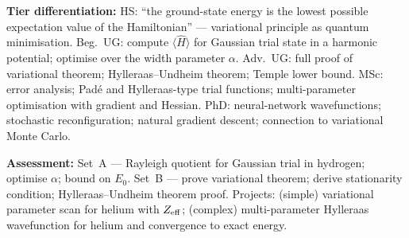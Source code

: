 \documentclass[11pt,a4paper]{article}
\begin{document}
\begin{tcolorbox}[modulebox, title={Module~II.1 / L01: The Variational Principle}]
\medskip\textbf{Tier differentiation:}
HS: ``the ground-state energy is the lowest possible expectation value of the Hamiltonian'' ---
variational principle as quantum minimisation.
Beg.\ UG: compute $\langle\hat{H}\rangle$ for Gaussian trial state in a harmonic potential;
optimise over the width parameter $\alpha$.
Adv.\ UG: full proof of variational theorem; Hylleraas--Undheim theorem; Temple lower bound.
MSc: error analysis; Pad\'e and Hylleraas-type trial functions; multi-parameter optimisation
with gradient and Hessian.
PhD: neural-network wavefunctions; stochastic reconfiguration; natural gradient descent;
connection to variational Monte Carlo.

\medskip\textbf{Assessment:}
Set~A --- Rayleigh quotient for Gaussian trial in hydrogen; optimise $\alpha$; bound on $E_0$.
Set~B --- prove variational theorem; derive stationarity condition; Hylleraas--Undheim theorem proof.
Projects: (simple) variational parameter scan for helium with $Z_{\rm eff}$;
(complex) multi-parameter Hylleraas wavefunction for helium and convergence to exact energy.
\end{tcolorbox}

\medskip
\end{document}
